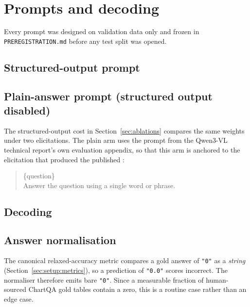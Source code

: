 \section{Prompts and decoding}
\label{app:prompts}

Every prompt was designed on validation data only and frozen in
\texttt{PREREGISTRATION.md} before any test split was opened.

\subsection{Structured-output prompt}

\subsection{Plain-answer prompt (structured output disabled)}

The structured-output cost in Section~\ref{sec:ablations} compares the same weights under two
elicitations. The plain arm uses the prompt from the Qwen3-VL technical report's own evaluation
appendix, so that this arm is anchored to the elicitation that produced the published
:

\begin{quote}\ttfamily
\{question\}\\
Answer the question using a single word or phrase.
\end{quote}

\subsection{Decoding}

\subsection{Answer normalisation}

The canonical relaxed-accuracy metric compares a gold answer of \texttt{"0"} as a \emph{string}
(Section~\ref{sec:setup:metrics}), so a prediction of \texttt{"0.0"} scores incorrect. The
normaliser therefore emits bare \texttt{"0"}. Since a measurable fraction of human-sourced ChartQA
gold tables contain a zero, this is a routine case rather than an edge case.

